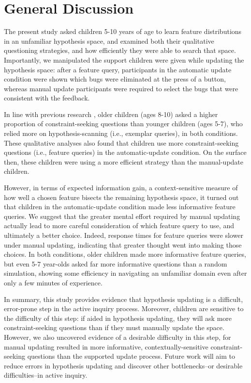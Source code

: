 \documentclass[man,floatsintext]{apa6}
\begin{document}
\section{General Discussion}
The present study asked children 5-10 years of age to learn feature distributions in an unfamiliar hypothesis space, and examined both their qualitative questioning strategies, and how efficiently they were able to search that space. Importantly, we manipulated the support children were 
given while updating the hypothesis space: after a feature query, participants in the 
automatic update condition were shown which bugs were eliminated at the press of 
a button, whereas manual update participants were required to select the bugs that 
were consistent with the feedback. 

In line with previous research \cite{Mosher:1966,Ruggeri:2014}, older children (ages 8-10) asked a higher proportion of constraint-seeking questions than younger children (ages 5-7), who relied more on hypothesis-scanning (i.e., exemplar queries), in both conditions. These qualitative analyses also found that children use more constraint-seeking questions (i.e., feature queries) in the automatic-update condition. On the surface then, these children were using a more efficient strategy than the manual-update children. 

However, in terms of expected information gain, a context-sensitive measure of how well a chosen feature bisects the remaining hypothesis space, it turned out that children in the 
automatic-update condition made less informative feature queries. We 
suggest that the greater mental effort required by manual updating actually lead 
to more careful consideration of which feature query to use, and ultimately a better choice. Indeed, response times for feature queries were slower under manual updating, indicating that greater thought went into making those choices. In both conditions, older children made more informative feature queries, but even 5-7 year-olds asked far more informative questions than a random simulation, showing some efficiency in navigating an unfamiliar domain even after only a few minutes of experience. 

In summary, this study provides evidence that hypothesis updating is a difficult, error-prone step in the active inquiry process. Moreover, children are sensitive to the difficulty of this step: if aided in hypothesis updating, they will ask more constraint-seeking questions than if they must manually update the space. However, we also uncovered evidence of a desirable difficulty in this step, for manual updating resulted in more informative, contextually-sensitive constraint-seeking questions than the supported update process. Future work will aim to reduce errors in hypothesis updating and discover other bottlenecks--or desirable difficulties--in active inquiry.
\end{document}
